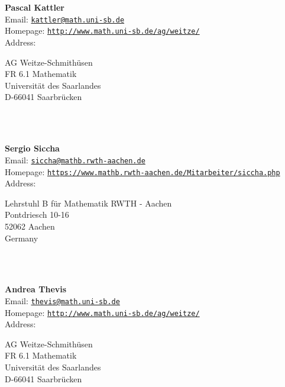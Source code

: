 \documentclass[a4paper,11pt]{report}
\begin{document}
\begin{titlepage}
\mbox{}\\
{\mbox{}\\
\small \noindent \textbf{ Pascal Kattler\\
    }  Email: \href{mailto://kattler@math.uni-sb.de} {\texttt{kattler@math.uni-sb.de}}\\
  Homepage: \href{http://www.math.uni-sb.de/ag/weitze/} {\texttt{http://www.math.uni-sb.de/ag/weitze/}}\\
  Address: \begin{minipage}[t]{8cm}\noindent
 AG Weitze-Schmith{\"u}sen\\
 FR 6.1 Mathematik\\
 Universit{\"a}t des Saarlandes\\
 D-66041 Saarbr{\"u}cken\\
 \end{minipage}
}\\
{\mbox{}\\
\small \noindent \textbf{ Sergio Siccha\\
    }  Email: \href{mailto://siccha@mathb.rwth-aachen.de} {\texttt{siccha@mathb.rwth-aachen.de}}\\
  Homepage: \href{https://www.mathb.rwth-aachen.de/Mitarbeiter/siccha.php} {\texttt{https://www.mathb.rwth-aachen.de/Mitarbeiter/siccha.php}}\\
  Address: \begin{minipage}[t]{8cm}\noindent
 Lehrstuhl B f{\"u}r Mathematik RWTH - Aachen\\
 Pontdriesch 10-16\\
 52062 Aachen\\
 Germany\\
 \end{minipage}
}\\
{\mbox{}\\
\small \noindent \textbf{ Andrea Thevis\\
    }  Email: \href{mailto://thevis@math.uni-sb.de} {\texttt{thevis@math.uni-sb.de}}\\
  Homepage: \href{http://www.math.uni-sb.de/ag/weitze/} {\texttt{http://www.math.uni-sb.de/ag/weitze/}}\\
  Address: \begin{minipage}[t]{8cm}\noindent
 AG Weitze-Schmith{\"u}sen\\
 FR 6.1 Mathematik\\
 Universit{\"a}t des Saarlandes\\
 D-66041 Saarbr{\"u}cken\\
 \end{minipage}
}\\
\end{titlepage}
\end{document}
